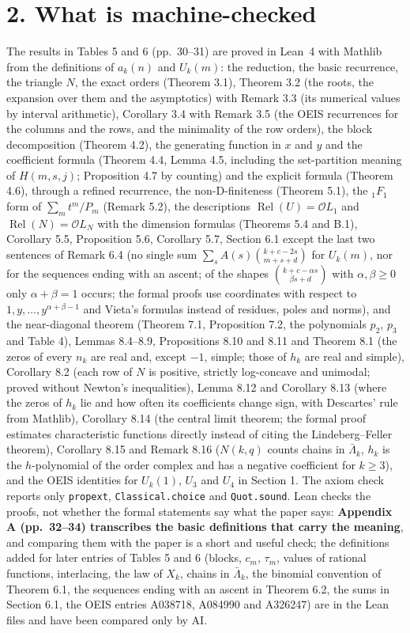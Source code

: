 \documentclass[10pt]{article}
\newcommand{\cO}{\mathcal{O}}
\DeclareMathOperator{\Rel}{Rel}
\begin{document}
\section*{2. What is machine-checked}
The results in Tables 5 and 6 (pp.~30--31) are proved in Lean~4 with Mathlib from the definitions of $a_k(n)$ and $U_k(m)$: the reduction, the basic recurrence, the triangle $N$, the exact orders (Theorem 3.1), Theorem 3.2 (the roots, the expansion over them and the asymptotics) with Remark 3.3 (its numerical values by interval arithmetic), Corollary 3.4 with Remark 3.5 (the OEIS recurrences for the columns and the rows, and the minimality of the row orders), the block decomposition (Theorem 4.2), the generating function in $x$ and $y$ and the coefficient formula (Theorem 4.4, Lemma 4.5, including the set-partition meaning of $H(m,s,j)$; Proposition 4.7 by counting) and the explicit formula (Theorem 4.6), through a refined recurrence, the non-D-finiteness (Theorem 5.1), the ${}_1F_1$ form of $\sum_m t^m/P_m$ (Remark 5.2), the descriptions $\Rel(U)=\cO L_1$ and $\Rel(N)=\cO L_N$ with the dimension formulas (Theorems 5.4 and B.1), Corollary 5.5, Proposition 5.6, Corollary 5.7, Section 6.1 except the last two sentences of Remark 6.4 (no single sum $\sum_sA(s)\binom{k+c-2s}{m+s+d}$ for $U_k(m)$, nor for the sequences ending with an ascent; of the shapes $\binom{k+c-\alpha s}{\beta s+d}$ with $\alpha,\beta\ge0$ only $\alpha+\beta=1$ occurs; the formal proofs use coordinates with respect to $1,y,\dots,y^{\alpha+\beta-1}$ and Vieta's formulas instead of residues, poles and norms), and the near-diagonal theorem (Theorem 7.1, Proposition 7.2, the polynomials $p_2$, $p_3$ and Table 4), Lemmas 8.4--8.9, Propositions 8.10 and 8.11 and Theorem 8.1 (the zeros of every $n_k$ are real and, except $-1$, simple; those of $h_k$ are real and simple), Corollary 8.2 (each row of $N$ is positive, strictly log-concave and unimodal; proved without Newton's inequalities), Lemma 8.12 and Corollary 8.13 (where the zeros of $h_k$ lie and how often its coefficients change sign, with Descartes' rule from Mathlib), Corollary 8.14 (the central limit theorem; the formal proof estimates characteristic functions directly instead of citing the Lindeberg--Feller theorem), Corollary 8.15 and Remark 8.16 ($N(k,q)$ counts chains in $\bar\Lambda_k$, $h_k$ is the $h$-polynomial of the order complex and has a negative coefficient for $k\ge3$), and the OEIS identities for $U_k(1)$, $U_3$ and $U_4$ in Section 1. The axiom check reports only \texttt{propext}, \texttt{Classical.choice} and \texttt{Quot.sound}. Lean checks the proofs, not whether the formal statements say what the paper says: \textbf{Appendix A (pp.~32--34) transcribes the basic definitions that carry the meaning}, and comparing them with the paper is a short and useful check; the definitions added for later entries of Tables 5 and 6 (blocks, $c_m$, $\tau_m$, values of rational functions, interlacing, the law of $X_k$, chains in $\bar\Lambda_k$, the binomial convention of Theorem 6.1, the sequences ending with an ascent in Theorem 6.2, the sums in Section 6.1, the OEIS entries A038718, A084990 and A326247) are in the Lean files and have been compared only by AI.
\end{document}
